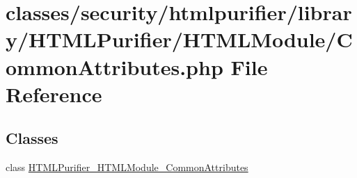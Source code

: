 \hypertarget{CommonAttributes_8php}{\section{classes/security/htmlpurifier/library/\+H\+T\+M\+L\+Purifier/\+H\+T\+M\+L\+Module/\+Common\+Attributes.php File Reference}
\label{CommonAttributes_8php}
}
\subsection*{Classes}
\begin{DoxyCompactItemize}
\item 
class \hyperlink{classHTMLPurifier__HTMLModule__CommonAttributes}{H\+T\+M\+L\+Purifier\+\_\+\+H\+T\+M\+L\+Module\+\_\+\+Common\+Attributes}
\end{DoxyCompactItemize}
